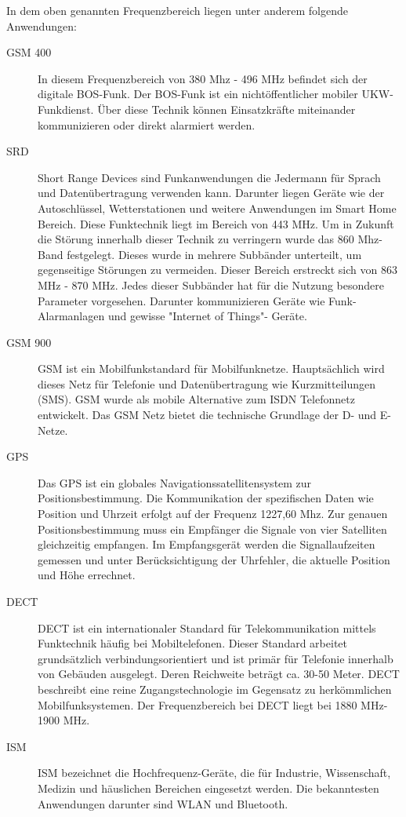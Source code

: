 In dem oben genannten Frequenzbereich liegen unter anderem folgende Anwendungen:

\begin{description}
	\item [\ac{GSM} 400]{In diesem Frequenzbereich von 380 Mhz - 496 MHz befindet sich der digitale \ac{BOS}-Funk. Der BOS-Funk ist ein nichtöffentlicher mobiler \ac{UKW}-Funkdienst. Über diese Technik können Einsatzkräfte miteinander kommunizieren oder direkt alarmiert werden.}
	\item [\ac{SRD}] {Short Range Devices sind Funkanwendungen die Jedermann für Sprach und Datenübertragung verwenden kann. Darunter liegen Geräte wie der Autoschlüssel, Wetterstationen und weitere Anwendungen im Smart Home Bereich. Diese Funktechnik liegt im Bereich von 443 MHz. Um in Zukunft die Störung innerhalb dieser Technik zu verringern  wurde das 860 Mhz-Band festgelegt. Dieses wurde in mehrere Subbänder unterteilt, um gegenseitige Störungen zu vermeiden. Dieser Bereich erstreckt sich von 863 MHz - 870 MHz. Jedes dieser Subbänder hat für die Nutzung besondere Parameter vorgesehen. Darunter kommunizieren Geräte wie Funk-Alarmanlagen und gewisse "Internet of Things"- Geräte.}
	\item [\ac{GSM} 900] {GSM ist ein Mobilfunkstandard für Mobilfunknetze. Hauptsächlich wird dieses Netz für Telefonie und Datenübertragung wie Kurzmitteilungen (SMS). GSM wurde als mobile Alternative zum ISDN Telefonnetz entwickelt. Das GSM Netz bietet die technische Grundlage der D- und E-Netze.  }
	\item [\ac{GPS}] {Das GPS ist ein globales Navigationssatellitensystem zur Positionsbestimmung. Die Kommunikation der spezifischen Daten wie Position und Uhrzeit erfolgt auf der Frequenz 1227,60 Mhz. Zur genauen Positionsbestimmung muss ein Empfänger die Signale von vier Satelliten gleichzeitig empfangen. Im Empfangsgerät werden die Signallaufzeiten gemessen und unter Berücksichtigung der Uhrfehler, die aktuelle Position und Höhe errechnet.}
	\item [\ac{DECT}] {DECT ist ein internationaler Standard für Telekommunikation mittels Funktechnik häufig bei Mobiltelefonen. Dieser Standard arbeitet grundsätzlich verbindungsorientiert und ist primär für Telefonie innerhalb von Gebäuden ausgelegt. Deren Reichweite beträgt ca. 30-50 Meter. DECT beschreibt eine reine Zugangstechnologie im Gegensatz zu herkömmlichen Mobilfunksystemen. Der Frequenzbereich bei DECT liegt bei 1880 MHz-1900 MHz.}
	\item [\ac{ISM}] {ISM bezeichnet die Hochfrequenz-Geräte, die für Industrie, Wissenschaft, Medizin und häuslichen Bereichen eingesetzt werden. Die bekanntesten Anwendungen darunter sind  WLAN und Bluetooth.}
\end{description}


